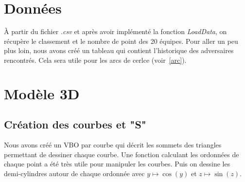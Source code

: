 \documentclass[a4paper,10.5pt]{report}
\begin{document}
    \chapter{Données}\label{ch:données}
    À partir du fichier \textit{.csv} et après avoir implémenté la fonction \textit{LoadData}, on récupère le classement et le nombre de point des 20 équipes.
    Pour aller un peu plus loin, nous avons créé un tableau qui contient l'historique des adversaires rencontrés.
    Cela sera utile pour les arcs de cerlce (voir~\ref{arc}).
    \chapter{Modèle 3D}\label{ch:modèle-3d}
    \section{Création des courbes et "S"}\label{sec:création-des-courbes-et-"s"}
    Nous avons créé un VBO par courbe qui décrit les sommets des triangles permettant de dessiner chaque courbe.
    Une fonction calculant les ordonnées de chaque point a été très utile pour manipuler les courbes.
    Puis on dessine les demi-cylindres autour de chaque ordonnée avec $y\mapsto \cos(y)$ et $z\mapsto\sin(z)$.
\end{document}
